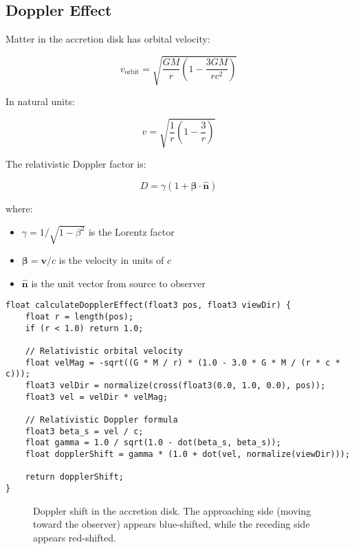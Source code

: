\documentclass[12pt,a4paper]{article}
\theoremstyle{definition}
\theoremstyle{remark}
\begin{document}
\subsection{Doppler Effect}

Matter in the accretion disk has orbital velocity:

\begin{equation}
    v_{\text{orbit}} = \sqrt{\frac{GM}{r}\left(1 - \frac{3GM}{rc^2}\right)}
\end{equation}

In natural units:

\begin{equation}
    v = \sqrt{\frac{1}{r}\left(1 - \frac{3}{r}\right)}
\end{equation}

The relativistic Doppler factor is:

\begin{equation}
    D = \gamma(1 + \boldsymbol{\beta} \cdot \hat{\mathbf{n}})
\end{equation}

where:
\begin{itemize}
    \item $\gamma = 1/\sqrt{1 - \beta^2}$ is the Lorentz factor
    \item $\boldsymbol{\beta} = \mathbf{v}/c$ is the velocity in units of $c$
    \item $\hat{\mathbf{n}}$ is the unit vector from source to observer
\end{itemize}

\begin{lstlisting}[style=metalstyle, caption=Doppler effect calculation]
float calculateDopplerEffect(float3 pos, float3 viewDir) {
    float r = length(pos);
    if (r < 1.0) return 1.0;
    
    // Relativistic orbital velocity
    float velMag = -sqrt((G * M / r) * (1.0 - 3.0 * G * M / (r * c * c)));
    float3 velDir = normalize(cross(float3(0.0, 1.0, 0.0), pos));
    float3 vel = velDir * velMag;
    
    // Relativistic Doppler formula
    float3 beta_s = vel / c;
    float gamma = 1.0 / sqrt(1.0 - dot(beta_s, beta_s));
    float dopplerShift = gamma * (1.0 + dot(vel, normalize(viewDir)));
    
    return dopplerShift;
}
\end{lstlisting}

\begin{figure}[H]
    \centering
    \caption{Doppler shift in the accretion disk. The approaching side (moving toward the observer) appears blue-shifted, while the receding side appears red-shifted.}
    \label{fig:doppler_disk}
\end{figure}
\end{document}
